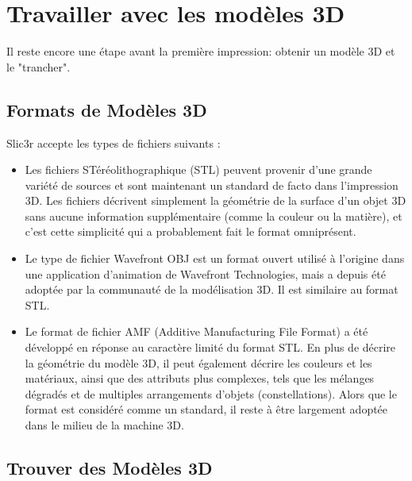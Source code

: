 \section{Travailler avec les mod\`eles 3D}
\label{sub:working_with_models}

Il reste encore une \'etape avant la premi\`ere impression: obtenir un mod\`ele 3D et le "trancher".

\subsection{Formats de Mod\`eles 3D} %
\label{sub:model_formats}

Slic3r accepte les types de fichiers suivants :

\begin{itemize}
	\item Les fichiers ST\'er\'eolithographique (STL) peuvent provenir d'une grande vari\'et\'e de sources et sont maintenant un standard de facto dans l'impression 3D. Les fichiers d\'ecrivent simplement la g\'eom\'etrie de la surface d'un objet 3D sans aucune information suppl\'ementaire (comme la couleur ou la mati\`ere), et c'est cette simplicit\'e qui a probablement fait le format omnipr\'esent.
	\item Le type de fichier Wavefront OBJ est un format ouvert utilis\'e \`a l'origine dans une application d'animation de Wavefront Technologies, mais a depuis \'et\'e adopt\'ee par la communaut\'e de la mod\'elisation 3D. Il est similaire au format STL.
	\item Le format de fichier AMF (Additive Manufacturing File Format) a \'et\'e d\'evelopp\'e en r\'eponse au caract\`ere limit\'e du format STL. En plus de d\'ecrire la g\'eom\'etrie du mod\`ele 3D, il peut \'egalement d\'ecrire les couleurs et les mat\'eriaux, ainsi que des attributs plus complexes, tels que les m\'elanges d\'egrad\'es et de multiples arrangements d'objets (constellations). Alors que le format est consid\'er\'e comme un standard, il reste \`a \^etre largement adopt\'ee dans le milieu de la machine 3D.
\end{itemize}

\subsection{Trouver des Mod\`eles 3D} %
\label{sub:finding_models}

